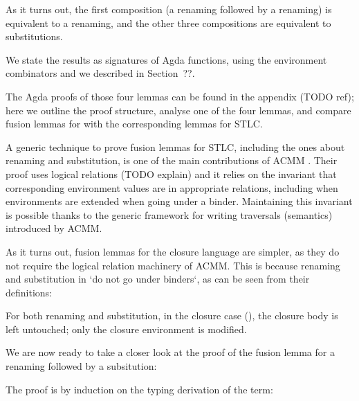 \documentclass[bsc,frontabs,twoside,singlespacing,parskip,deptreport]{infthesis}
\theoremstyle{definition}
\begin{document}
As it turns out, the first composition (a renaming followed by a
renaming) is equivalent to a renaming, and the other three compositions
are equivalent to substitutions. 

We state the results as signatures of Agda functions, using the
environment combinators \AS{\_<\$>\_} and  we described in Section~??.


The Agda proofs of those four lemmas can be found in the appendix
(TODO ref); here we outline the proof structure, analyse one of the
four lemmas, and compare
fusion lemmas for \lcl with the corresponding lemmas for STLC.

A generic technique to prove fusion lemmas for STLC,
including the ones about renaming and substitution, is one of the main
contributions of ACMM \cite{DBLP:conf/cpp/Allais0MM17}. Their proof
uses logical relations (TODO explain) and it relies on the invariant
that corresponding environment values are in appropriate relations,
including when environments are extended when going under a
binder. Maintaining this invariant is possible thanks to the generic
framework for writing traversals (semantics) introduced by ACMM.

As it turns out, fusion lemmas for the closure language are simpler,
as they do not require the logical relation machinery of ACMM. This is
because renaming and substitution in \lcl `do not go under binders`,
as can be seen from their definitions:


For both renaming and substitution, in the closure case (), the
closure body is left untouched; only the closure environment is
modified.

We are now ready to take a closer look at the proof of the fusion
lemma for a renaming followed by a subsitution:


The proof is by induction on the typing derivation of the term:
\end{document}
